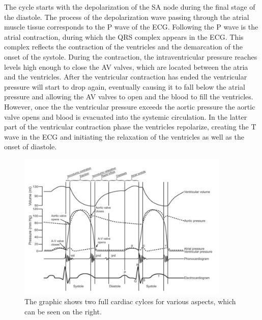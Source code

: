The cycle starts with the depolarization of the SA node during the final stage of the diastole. The process of the depolarization wave passing through the atrial muscle tissue corresponds to the P wave of the ECG. Following the P wave is the atrial contraction, during which the QRS complex appears in the ECG. This complex reflects the contraction of the ventricles and the demarcation of the onset of the systole. During the contraction, the intraventricular pressure reaches levels high enough to close the AV valves, which are located between the atria and the ventricles. After the ventricular contraction has ended the ventricular pressure will start to drop again, eventually causing it to fall below the atrial pressure and allowing the AV valves to open and the blood to fill the ventricles. However, once the the ventricular pressure exceeds the aortic pressure the aortic valve opens and blood is evacuated into the systemic circulation. In the latter part of the ventricular contraction phase the ventricles repolarize, creating the T wave in the ECG and initiating the relaxation of the ventricles as well as the onset of diastole. 

\begin{figure}[ht]
\centering
\includegraphics[width=0.9\textwidth]{images/cycleImg.png}
\caption{The graphic shows two full cardiac cylces for various aspects, which can be seen on the right.}
\label{cycleImg}
\end{figure}


